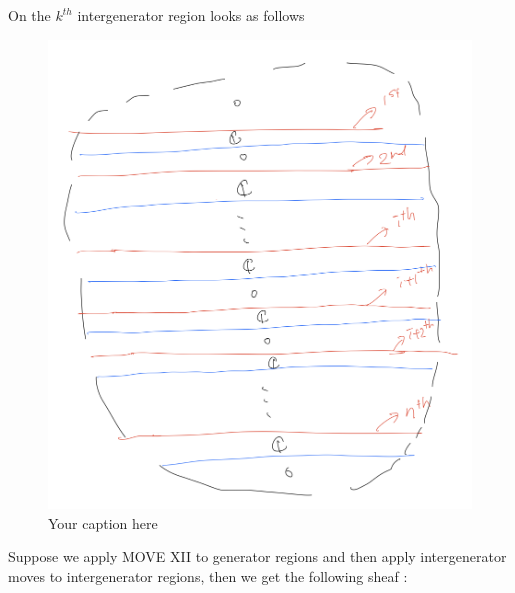 On the $k^{th}$ intergenerator region looks as follows

\begin{figure}[H] %
    \centering
    \includegraphics[width=\linewidth]{diagrams/theorem15/2.png} %
    \caption{Your caption here}
    \label{fig:your-label}
\end{figure}

Suppose we apply MOVE \RN{12} to generator regions and then apply intergenerator moves to intergenerator regions, then we get the following sheaf :

